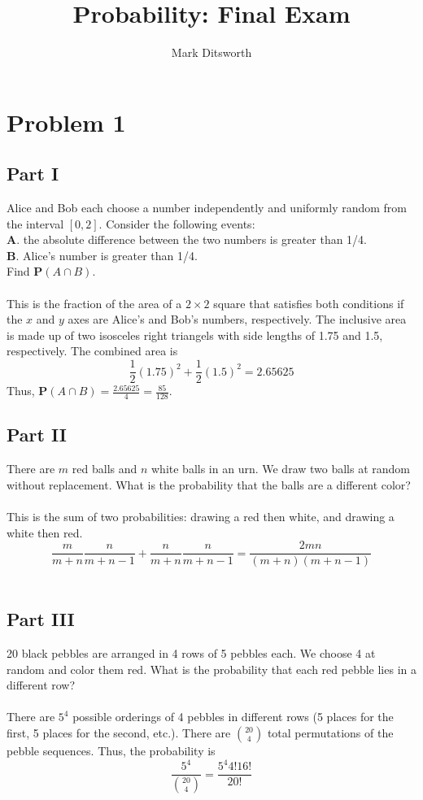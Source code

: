 \documentclass{amsart}
\title{Probability: Final Exam}
\author{Mark Ditsworth}
\begin{document}
	\maketitle
	\section{Problem 1}
	\subsection{Part I}
	Alice and Bob each choose a number independently and uniformly random from the interval $[0,2]$. Consider the following events:\\
	\textbf{A}. the absolute difference between the two numbers is greater than 1/4.\\
	\textbf{B}. Alice's number is greater than 1/4.\\
	Find $\mathbf{P}(A\cap B)$.\\
	\\
	This is the fraction of the area of a $2\times 2$ square that satisfies both conditions if the $x$ and $y$ axes are Alice's and Bob's numbers, respectively. The inclusive area is made up of two isosceles right triangels with side lengths of 1.75 and 1.5, respectively. The combined area is
	\[
	\frac{1}{2}(1.75)^2 + \frac{1}{2}(1.5)^2 = 2.65625
	\]
	Thus, $\mathbf{P}(A\cap B) = \frac{2.65625}{4} = \frac{85}{128}$.
	\\
	\subsection{Part II}
	There are $m$ red balls and $n$ white balls in an urn. We draw two balls at random without replacement. What is the probability that the balls are a different color?\\
	\\
	This is the sum of two probabilities: drawing a red then white, and drawing a white then red.
	\[
	\frac{m}{m+n}\frac{n}{m+n-1} + \frac{n}{m+n}\frac{n}{m+n-1} = \frac{2mn}{(m+n)(m+n-1)}
	\]
	\\
	\subsection{Part III}
	20 black pebbles are arranged in 4 rows of 5 pebbles each. We choose 4 at random and color them red. What is the probability that each red pebble lies in a different row?\\
	\\
	There are $5^4$ possible orderings of 4 pebbles in different rows (5 places for the first, 5 places for the second, etc.). There are $\binom{20}{4}$ total permutations of the pebble sequences. Thus, the probability is
	\[
	\frac{5^4}{\binom{20}{4}} = \frac{5^4 4!16!}{20!}
	\]
	\\
\end{document}
